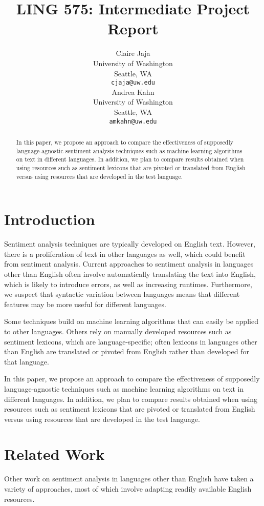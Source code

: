 \documentclass[11pt]{article}
\title{LING 575: Intermediate Project Report}
\author{Claire Jaja \\
  University of Washington \\
  Seattle, WA \\
  {\tt cjaja@uw.edu} \\\And
  Andrea Kahn \\
  University of Washington \\
  Seattle, WA \\
  {\tt amkahn@uw.edu} \\}
\date{}
\begin{document}
\maketitle
\begin{abstract}
In this paper, we propose an approach to compare the effectiveness of supposedly language-agnostic sentiment analysis techniques such as machine learning algorithms on text in different languages.  In addition, we plan to compare results obtained when using resources such as sentiment lexicons that are pivoted or translated from English versus using resources that are developed in the test language.
\end{abstract}

\section{Introduction}

Sentiment analysis techniques are typically developed on English text.  However, there is a proliferation of text in other languages as well, which could benefit from sentiment analysis.  Current approaches to sentiment analysis in languages other than English often involve automatically translating the text into English, which is likely to introduce errors, as well as increasing runtimes.  Furthermore, we suspect that syntactic variation between languages means that different features may be more useful for different languages.

Some techniques build on machine learning algorithms that can easily be applied to other languages.  Others rely on manually developed resources such as sentiment lexicons, which are language-specific; often lexicons in languages other than English are translated or pivoted from English rather than developed for that language.

In this paper, we propose an approach to compare the effectiveness of supposedly language-agnostic techniques such as machine learning algorithms on text in different languages.  In addition, we plan to compare results obtained when using resources such as sentiment lexicons that are pivoted or translated from English versus using resources that are developed in the test language.

\section{Related Work}

Other work on sentiment analysis in languages other than English have taken a variety of approaches, most of which involve adapting readily available English resources.
\end{document}
